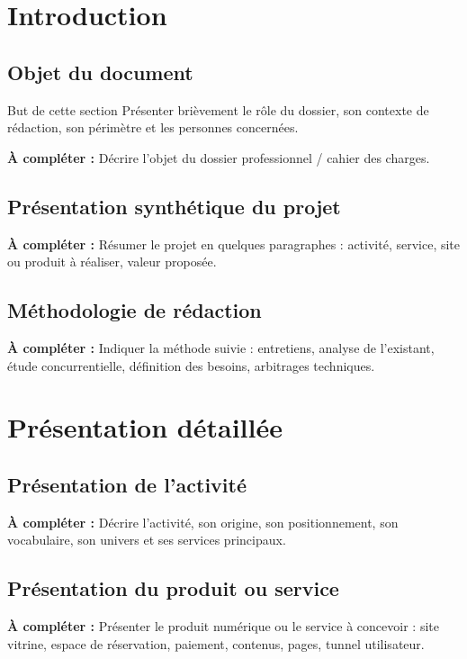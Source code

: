 \documentclass[11pt,a4paper]{report}
\newcommand{\todo}[1]{\textcolor{todoColor}{\textbf{À compléter :} #1}}
\newcommand{\blankspace}[1]{\vspace*{#1}}
\begin{document}
\chapter{Introduction}

\section{Objet du document}
\begin{infobox}{But de cette section}
Présenter brièvement le rôle du dossier, son contexte de rédaction, son périmètre et les personnes concernées.
\end{infobox}

\todo{Décrire l'objet du dossier professionnel / cahier des charges.}
\blankspace{6cm}

\section{Présentation synthétique du projet}
\todo{Résumer le projet en quelques paragraphes : activité, service, site ou produit à réaliser, valeur proposée.}
\blankspace{8cm}

\section{Méthodologie de rédaction}
\todo{Indiquer la méthode suivie : entretiens, analyse de l'existant, étude concurrentielle, définition des besoins, arbitrages techniques.}
\blankspace{6cm}

\chapter{Présentation détaillée}

\section{Présentation de l'activité}
\todo{Décrire l'activité, son origine, son positionnement, son vocabulaire, son univers et ses services principaux.}
\blankspace{8cm}

\section{Présentation du produit ou service}
\todo{Présenter le produit numérique ou le service à concevoir : site vitrine, espace de réservation, paiement, contenus, pages, tunnel utilisateur.}
\blankspace{8cm}
\end{document}
